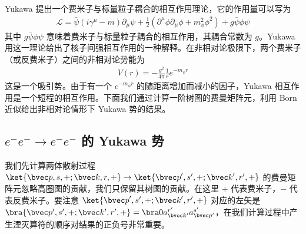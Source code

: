 
Yukawa 提出一个费米子与标量粒子耦合的相互作用理论，它的作用量可以写为
\begin{equation}
\begin{aligned}
\mathcal{L}=\bar\psi (i\gamma^\mu-m) \partial_\mu \psi+
\frac{1}{2}(\partial^\mu \phi \partial_\mu \phi + m_\phi^2 \phi^2) + g\bar\psi\phi\psi
\end{aligned}
\end{equation}
其中 $g\bar\psi \phi\psi$ 意味着费米子与标量粒子耦合的相互作用，其耦合常数为 $g$。Yukawa 用这一理论给出了核子间强相互作用的一种解释。在非相对论极限下，两个费米子（或反费米子）之间的非相对论势能为
\begin{equation}
\begin{aligned}
V(r)=-\frac{g^2}{4\pi} \frac{1}{r} e^{- m_\phi r}
\end{aligned}
\end{equation}
这是一个吸引势。由于有一个 $e^{-m_\phi r}$ 的随距离增加而减小的因子，Yukawa 相互作用是一个短程的相互作用。下面我们通过计算一阶树图的费曼矩阵元，利用 Born 近似给出非相对论情形下 Yukawa 势的结果。

\subsection{$e^-e^-\rightarrow e^-e^-$ 的 Yukawa 势}

我们先计算两体散射过程 $\ket{{\bvec p},s,+;{\bvec k},r,+}\rightarrow \ket{{\bvec p}',s',+;{\bvec k}',r',+}$ 的费曼矩阵元忽略高圈图的贡献，我们只保留其树图的贡献。在这里 $+$ 代表费米子，$-$ 代表反费米子。要注意 $\ket{{\bvec p}',s',+;{\bvec k}',r',+}$ 对应的左矢是 $\bra{\bvec p',s',+;\bvec k',r',+}=\bra 0 a_{\bvec k'}^{r'} a_{\bvec p'}^{s'}$，在我们计算过程中产生湮灭算符的顺序对结果的正负号非常重要。

